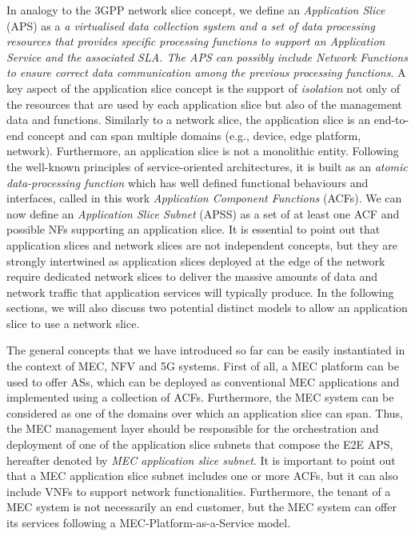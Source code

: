 In analogy to the 3GPP network slice concept, we define an \textit{Application Slice} (APS) as a \textit{a virtualised data collection system and a set of data processing resources that provides specific processing functions to support an Application Service and the associated SLA. The APS can possibly include Network Functions to ensure correct data communication among the previous processing functions}. A key aspect of the application slice concept is the support of \textit{isolation} not only of the resources that are used by each application slice but also of the management data and functions. Similarly to a network slice, the application slice is an end-to-end concept and can span multiple domains (e.g., device, edge platform, network). Furthermore, an application slice is not a monolithic entity. Following the well-known principles of service-oriented architectures, it is built as an \textit{atomic data-processing function} which has well defined functional behaviours and interfaces, called in this work \emph{Application Component Functions} (ACFs). We can now define an \textit{Application Slice Subnet} (APSS) as a set of at least one ACF and possible NFs supporting an application slice. It is essential to point out that application slices and network slices are not independent concepts, but they are strongly intertwined as application slices deployed at the edge of the network require dedicated network slices to deliver the massive amounts of data and network traffic that application services will typically produce. In the following sections, we will also discuss two potential distinct models to allow an application slice to use a network slice.  

The general concepts that we have introduced so far can be easily instantiated in the context of MEC, NFV and 5G systems. First of all, a MEC platform can be used to offer ASs, which can be deployed as conventional MEC applications and implemented using a collection of ACFs. Furthermore, the MEC system can be considered as one of the domains over which an application slice can span. Thus, the MEC management layer should be responsible for the orchestration and deployment of one of the application slice subnets that compose the E2E APS, hereafter denoted by \textit{MEC application slice subnet}. It is important to point out that a MEC application slice subnet includes one or more ACFs, but it can also include VNFs to support network functionalities. Furthermore, the tenant of a MEC system is not necessarily an end customer, but the MEC system can offer its services following a MEC-Platform-as-a-Service model.  

